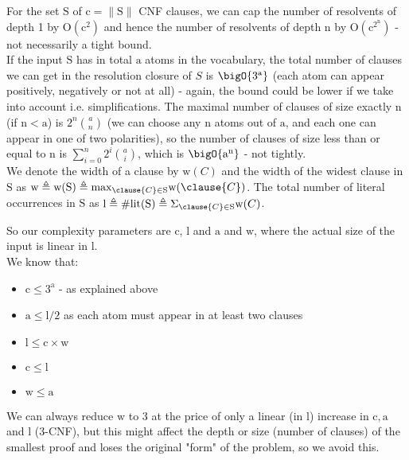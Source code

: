 \noindent
For the set $\mathrm{S}$ of $\mathrm{c}=\|\mathrm{S}\|$ CNF clauses, we can cap the number of resolvents of depth 1 by $\mathrm{O}(\mathrm{c}^2)$ and hence the number of resolvents of depth n by $\mathrm{O}(\mathrm{c}^{2^\mathrm{n}})$ - not necessarily a tight bound.\\
\noindent
If the input $\mathrm{S}$ has in total $\mathrm{a}$ atoms in the vocabulary, the total number of clauses we can get in the resolution closure of $S$ is $\bigO{3^\mathrm{a}}$ (each atom can appear positively, negatively or not at all) - again, the bound could be lower if we take into account i.e. simplifications. 
The maximal number of clauses of size exactly $\mathrm{n}$ (if $\mathrm{n}<\mathrm{a}$) is $2^n\binom{a}{n}$ 
(we can choose any $\mathrm{n}$ atoms out of $\mathrm{a}$, and each one can appear in one of two polarities), 
so the number of clauses of size less than or equal to $\mathrm{n}$ is $\sum\limits_{i=0}^{n}2^i\binom{a}{i}$, 
which is $\bigO{\mathrm{a}^\mathrm{n}}$ - not tightly.\\
\noindent
We denote the width of a clause  by $\mathrm{w}(C)$ and the width of the widest clause in $\mathrm{S}$ as $\mathrm{w} \triangleq \mathrm{w}(\mathrm{S}) \triangleq \mathrm{max}_{\clause{C} \in \mathrm{S}} \mathrm{w}(\clause{C})$.
The total number of literal occurrences in $\mathrm{S}$ as $\mathrm{l} \triangleq \mathrm{\#lit}(\mathrm{S}) \triangleq \Sigma_{\clause{C} \in \mathrm{S}} \mathrm{w}(C)$.

\noindent
So our complexity parameters are $\mathrm{c}$, $\mathrm{l}$ and $\mathrm{a}$ and $\mathrm{w}$, where the actual size of the input is linear in $\mathrm{l}$.\\
We know that:
\begin{itemize}
	\item $\mathrm{c} \leq 3^\mathrm{a}$ - as explained above
	\item $\mathrm{a} \leq \mathrm{l}/2$ as each atom must appear in at least two clauses
	\item $\mathrm{l} \leq \mathrm{c} \times \mathrm{w}$
	\item $\mathrm{c} \leq \mathrm{l}$
	\item $\mathrm{w} \leq \mathrm{a}$
\end{itemize}

We can always reduce $\mathrm{w}$ to 3 at the price of only a linear (in $\mathrm{l}$) increase in $\mathrm{c},\mathrm{a}$ and $\mathrm{l}$ (3-CNF), but this might affect the depth or size (number of clauses) of the smallest proof and loses the original "form" of the problem, so we avoid this.

